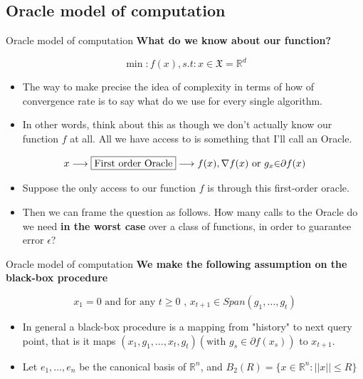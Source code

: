 \subsection{Oracle model of computation}
\begin{frame}{Oracle model of computation}
    \textbf{What do we know about our function?}
    \begin{spacing}{0.9}
    $$\min:f(x), s.t: x \in \mathfrak{X}=\mathds{R}^d$$
    \end{spacing}
    
    \begin{itemize}
        \item The way to make precise the idea of complexity in terms of how of convergence rate is to say what do we use for every single algorithm.
        \item In other words, think about this as though we don't actually know our function $f$ at all. All we have access to is something that I'll call an Oracle. 
        
    \end{itemize}
    $$x\longrightarrow\fbox{First order Oracle}\longrightarrow f(x),{\nabla}f(x) {\text{ or }} g_x {\in} {\partial}f(x)$$

    \begin{itemize}
        \item Suppose the only access to our function $f$ is through this first-order oracle.
        \item Then we can frame the question as follows. How many calls to the Oracle do we need \textbf{in the worst case} over a class of functions, in order to guarantee error $\epsilon$?
    \end{itemize}
\end{frame}
\begin{frame}{Oracle model of computation}
    \textbf{We make the
following assumption on the black-box procedure}

\begin{equation}\label{eq:1}
             x_1=0 \text{ and for any }t\geq 0 \text{ , }x_{t+1} \in Span(g_1,\dots,g_t)
\end{equation}
    \begin{itemize}
        \item In general a black-box procedure is a mapping from "history" to next query point, that is it maps $(x_1,g_1,\dots,x_t,g_t)(\text{with } g_s \in \partial f(x_s))$ to $x_{t+1}$.
        
        \item Let $e_1,\dots,e_n$ be the canonical basis of $\mathds{R}^n$, and $B_2(R) = \{x \in \mathds{R}^n : ||x||\leq R\}$
    \end{itemize}
    

       
\end{frame}

